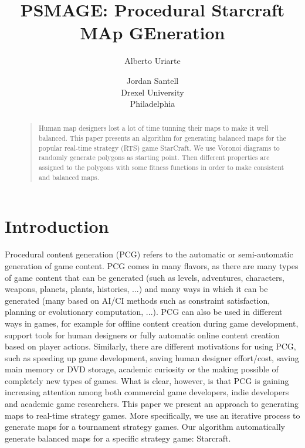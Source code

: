 \documentclass[letterpaper]{article}
\begin{document}
%
\title{PSMAGE: Procedural Starcraft MAp GEneration}
\author{Alberto Uriarte \and Jordan Santell\\
Drexel University\\
Philadelphia\\
}
\maketitle
\begin{abstract}
\begin{quote}
Human map designers lost a lot of time tunning their maps to make it well balanced. This paper presents an algorithm for generating balanced maps for the popular real-time strategy (RTS) game StarCraft. We use Voronoi diagrams to randomly generate polygons as starting point. Then different properties are assigned to the polygons with some fitness functions in order to make consistent and balanced maps.
\end{quote}
\end{abstract}


\section{Introduction} %
\label{sec:introduction}
Procedural content generation (PCG) refers to the automatic or semi-automatic generation of game content. PCG comes in many ﬂavors, as there are many types of game content that can be generated (such as levels, adventures, characters, weapons, planets, plants, histories, ...) and many ways in which it can be generated (many based on AI/CI methods such as constraint satisfaction, planning or evolutionary computation, ...). PCG can also be used in different ways in games, for example for ofﬂine content creation during game development, support tools for human designers or fully automatic online content creation based on player actions. Similarly, there are different motivations for using PCG, such as speeding up game development, saving human designer effort/cost, saving main memory or DVD storage, academic curiosity or the making possible of completely new types of games. What is clear, however, is that PCG is gaining increasing attention among both commercial game developers, indie developers and academic game researchers.
This paper we present an approach to generating maps to real-time strategy games. More speciﬁcally, we use an iterative process to generate maps for a tournament strategy games. Our algorithm automatically generate balanced maps for a specific strategy game: Starcraft.
\end{document}
